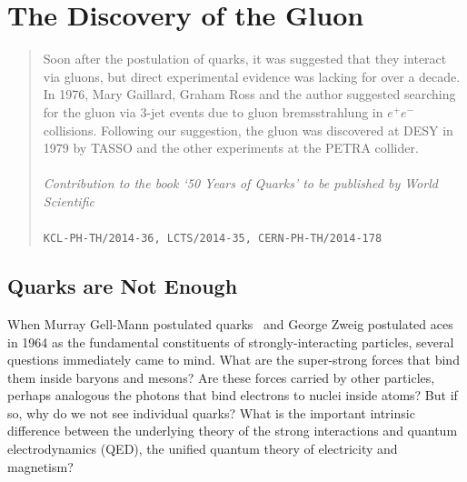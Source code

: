 \documentclass{ws-rv975x65}[12pt]
\begin{document}
\chapter*{The Discovery of the Gluon}

\author[John Ellis]{John Ellis}%

\address{Theoretical Particle Physics and Cosmology Group, Department of
  Physics, King's~College~London, London WC2R 2LS, United Kingdom\\
\& Theory Division, CERN, CH-1211 Geneva 23,
  Switzerland, \\
John.Ellis@cern.ch}%

\begin{abstract}
Soon after the postulation of quarks, it was suggested that they interact via
gluons, but direct experimental evidence was lacking for over a decade.
In 1976, Mary Gaillard, Graham Ross and the author suggested searching for the
gluon via 3-jet events due to gluon bremsstrahlung in $e^+ e^-$ collisions. Following
our suggestion, the gluon was discovered at DESY in 1979 by TASSO and the other experiments
at the PETRA collider. \\ \\
\emph{Contribution to the book `50 Years of Quarks' to be published by World Scientific}\\ \\
{\tt KCL-PH-TH/2014-36, LCTS/2014-35, CERN-PH-TH/2014-178}


\end{abstract}
\body

\section{Quarks are Not Enough}\label{ra_sec1}

When Murray Gell-Mann postulated quarks~\cite{MGM} and George Zweig postulated aces~\cite{GZ} in 1964 as the fundamental
constituents of strongly-interacting particles, several questions immediately came to mind.
What are the super-strong forces that bind them inside baryons and mesons?
Are these forces carried by other particles, perhaps analogous the photons that
bind electrons to nuclei inside atoms? But if so, why do we not see individual quarks?
What is the important intrinsic difference between the underlying theory
of the strong interactions and quantum electrodynamics (QED), the unified quantum theory of
electricity and magnetism?
\end{document}
